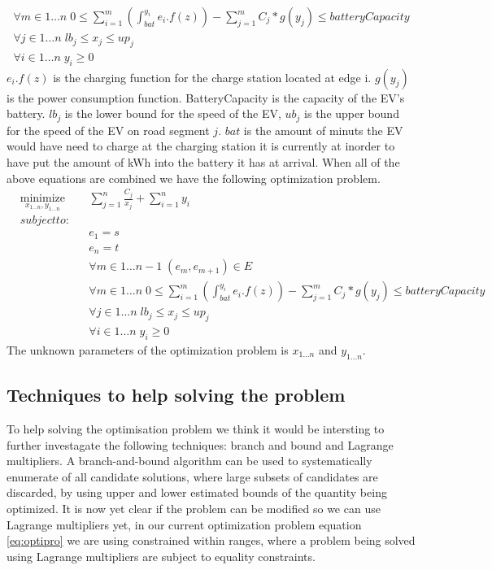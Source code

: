 \begin{gather}
\forall{m \in 1 \dots n} \; 0 \leq \sum_{i=1}^{m} \left( \int_{bat}^{y_i} e_i.f(z) \right) - \sum_{j=1}^{m} C_j*g(y_j) \leq batteryCapacity \\
\forall{j \in 1 \dots n} \; lb_j \leq x_j \leq up_j \\
\forall{i \in 1 \dots n} \; y_i \geq 0
\end{gather}\label{eq:physicalconstraints}
$e_i.f(z)$ is the charging function for the charge station located at edge i. $g(y_j)$ is the power consumption function. BatteryCapacity is the capacity of the EV's battery. 
$lb_j$ is the lower bound for the speed of the EV, $ub_j$ is the upper bound for the speed of the EV on road segment $j$. $bat$ is the amount of minuts the EV would have need to charge at the charging station it is currently at inorder to have put the amount of kWh into the battery it has at arrival. When all of the above equations are combined we have the following optimization problem. 
\begin{equation}
\begin{aligned}
&\underset{x_{1 \dots n},y_{1 \dots n}}{\text{minimize}}
& &\sum_{j=1}^{n} \frac{C_j}{x_j} + \sum_{i=1}^{n} y_i \\
&subject to: \\
&&&e_1 = s \\
&&&e_n = t \\
&&&\forall{m \in 1 \dots n-1} \; (e_m, e_{m+1}) \in E \\
&&&\forall{m \in 1 \dots n} \; 0 \leq \sum_{i=1}^{m} \left( \int_{bat}^{y_i} e_i.f(z) \right) - \sum_{j=1}^{m} C_j*g(y_j) \leq batteryCapacity \\
&&&\forall{j \in 1 \dots n} \; lb_j \leq x_j \leq up_j \\
&&&\forall{i \in 1 \dots n} \; y_i \geq 0 
\end{aligned}
\end{equation} \label{eq:optiproblem}
The unknown parameters of the optimization problem is $x_{1\dots n}$ and $y_{1\dots n}$. 


\subsection{Techniques to help solving the problem}
To help solving the optimisation problem we think it would be intersting to further investagate the following techniques: branch and bound and Lagrange multipliers.
A branch-and-bound algorithm can be used to systematically enumerate  of all candidate solutions, where large subsets of candidates are discarded, by using upper and lower estimated bounds of the quantity being optimized. 
It is now yet clear if the problem can be modified so we can use Lagrange multipliers yet, in our current optimization problem equation \ref{eq:optipro} we are using constrained within ranges, where a problem being solved using Lagrange multipliers are subject to equality constraints.



